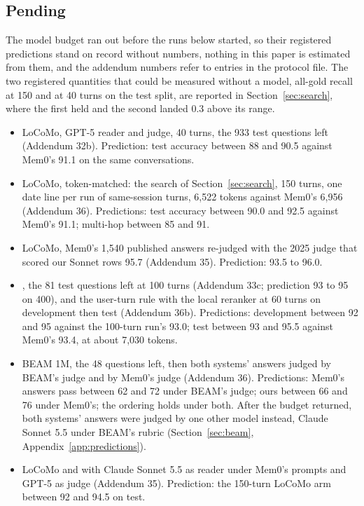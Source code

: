 \subsection{Pending}
\label{sec:pending}

The model budget ran out before the runs below started, so their registered predictions stand on record without numbers, nothing in this paper is estimated from them, and the addendum numbers refer to entries in the protocol file. The two registered quantities that could be measured without a model, all-gold recall at 150 and at 40 turns on the test split, are reported in Section~\ref{sec:search}, where the first held and the second landed 0.3 above its range.

\begin{itemize}
\setlength{\itemsep}{1pt}
\item LoCoMo, GPT-5 reader and judge, 40 turns, the 933 test questions left (Addendum 32b). Prediction: test accuracy between 88 and 90.5 against Mem0's 91.1 on the same conversations.
\item LoCoMo, token-matched: the search of Section~\ref{sec:search}, 150 turns, one date line per run of same-session turns, 6,522 tokens against Mem0's 6,956 (Addendum 36). Predictions: test accuracy between 90.0 and 92.5 against Mem0's 91.1; multi-hop between 85 and 91.
\item LoCoMo, Mem0's 1,540 published answers re-judged with the 2025 judge that scored our Sonnet rows 95.7 (Addendum 35). Prediction: 93.5 to 96.0.
\item \lmes{}, the 81 test questions left at 100 turns (Addendum 33c; prediction 93 to 95 on 400), and the user-turn rule with the local reranker at 60 turns on development then test (Addendum 36b). Predictions: development between 92 and 95 against the 100-turn run's 93.0; test between 93 and 95.5 against Mem0's 93.4, at about 7,030 tokens.
\item BEAM 1M, the 48 questions left, then both systems' answers judged by BEAM's judge and by Mem0's judge (Addendum 36). Predictions: Mem0's answers pass between 62 and 72 under BEAM's judge; ours between 66 and 76 under Mem0's; the ordering holds under both. After the budget returned, both systems' answers were judged by one other model instead, Claude Sonnet 5.5 under BEAM's rubric (Section~\ref{sec:beam}, Appendix~\ref{app:predictions}).
\item LoCoMo and \lmes{} with Claude Sonnet 5.5 as reader under Mem0's prompts and GPT-5 as judge (Addendum 35). Prediction: the 150-turn LoCoMo arm between 92 and 94.5 on test.
\end{itemize}
